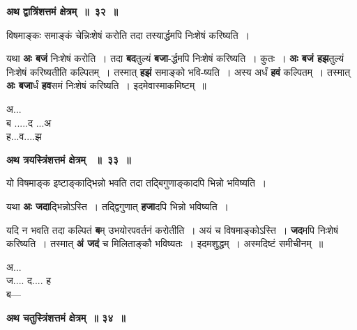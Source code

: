 \documentclass[11pt, openany]{book}
\begin{document}
\begin{center}
\textbf{ अथ द्वात्रिंशत्तमं क्षेत्रम्~॥~३२~॥}
\end{center}

{\ab विषमाङ्कः समाङ्कं चेन्निःशेषं करोति तदा तस्यार्द्धमपि  निःशेषं करिष्यति~। }

\begin{flushleft}
\begin{minipage}[t]{0.67\textwidth}
\hspace{4mm} यथा \textbf{अः बजं} निःशेषं करोति~। तदा \textbf{बद}तुल्यं \textbf{बजा}-र्द्धमपि निःशेषं करिष्यति~। कुतः~। \textbf{अः बजं हझ}तुल्यं निःशेषं करिष्यतीति कल्पितम्~। तस्मात् \textbf{हझं} समाङ्को भवि-ष्यति~। अस्य अर्धं \textbf{हवं} कल्पितम्~। तस्मात् \textbf{अः बजा}र्धं \textbf{हव}समं निःशेषं करिष्यति~। इदमेवास्माकमिष्टम्~॥
\end{minipage} 
\hfill
\begin{minipage}[t]{0.23\textwidth}
अ...\\ 
ब .....द ...अ \\
ह...व....झ
\end{minipage}
\end{flushleft}
\vspace{-1mm}
 
\begin{center}
\textbf{\large अथ त्रयस्त्रिंशत्तमं क्षेत्रम् ~॥~३३~॥}
\end{center}

{\ab  यो विषमाङ्क इष्टाङ्काद्भिन्नो भवति तदा तद्बिगुणाङ्कादपि भिन्नो भविष्यति~। }

\newpage
 यथा \textbf{अः जदा}द्भिन्नोऽस्ति~। तद्द्विगुणात् \textbf{हजा}दपि भिन्नो भविष्यति~। 

\begin{flushleft}
\begin{minipage}[t]{0.7\textwidth}
\hspace{4mm} यदि न भवति तदा कल्पितं \textbf{ब}म् उभयोरपवर्तनं  करोतीति~। अयं च विषमाङ्कोऽस्ति~। \textbf{जद}मपि निःशेषं करिष्यति~। तस्मात् \textbf{अं जदं} च मिलिताङ्कौ भविष्यतः~। इदमशुद्धम्~। अस्मदिष्टं समीचीनम्~॥
\end{minipage} 
\hfill
\begin{minipage}[t]{0.2\textwidth}
अ...\\
ज.... द.... ह\\ 
ब---
\end{minipage}
\end{flushleft}
\vspace{-1mm}

\begin{center}
\textbf{\large अथ चतुस्त्रिंशत्तमं क्षेत्रम्~॥ ३४~॥ }
\end{center}
\end{document}
